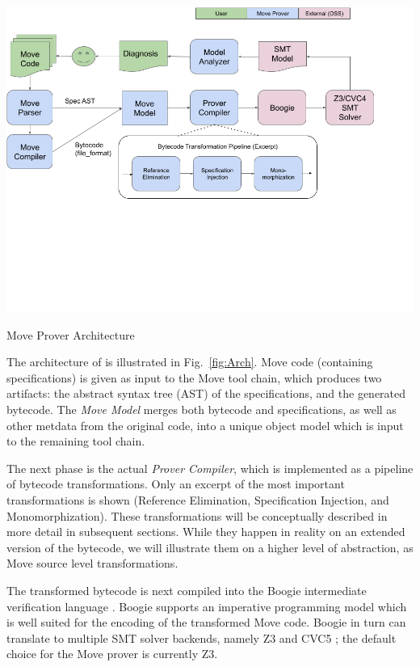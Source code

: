 
\begin{Figure}
  \centering
  \includegraphics[trim=0 250 0 0, width=\textwidth]{arch.png}
  \caption{Move Prover Architecture}
  \label{fig:Arch}
\end{Figure}

The architecture of \MVP is illustrated in Fig.~\ref{fig:Arch}. Move code
(containing specifications) is given as input to the Move tool chain, which
produces two artifacts: the abstract syntax tree (AST) of the specifications,
and the generated bytecode.  The \emph{Move Model} merges both bytecode and
specifications, as well as other metdata from the original code, into a unique
object model which is input to the remaining tool chain.

The next phase is the actual \emph{Prover Compiler}, which is implemented as a
pipeline of bytecode transformations. Only an excerpt of the most important
transformations is shown (Reference Elimination, Specification Injection, and
Monomorphization). These transformations will be conceptually described in more
detail in subsequent sections. While they happen in reality on an extended
version of the bytecode, we will illustrate them on a higher level of
abstraction, as Move source level transformations.

The transformed bytecode is next compiled into the Boogie intermediate
verification language \cite{BOOGIE}. Boogie supports an imperative programming
model which is well suited for the encoding of the transformed Move code. Boogie
in turn can translate to multiple SMT solver backends, namely Z3 \cite{Z3} and
CVC5 \cite{CVC}; the default choice for the Move prover is currently Z3.

